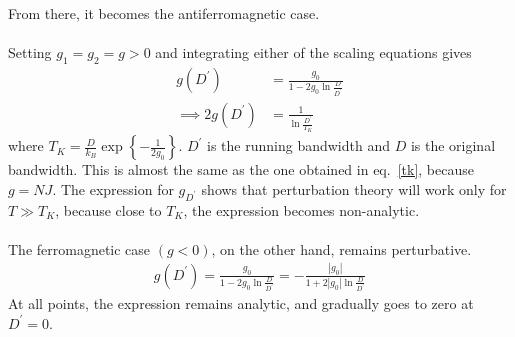 \documentclass[twoside,11pt]{report}
\numberwithin{equation}{section}
\begin{document}
From there, it becomes the antiferromagnetic case.\\\\
Setting \(g_1 = g_2 =g >0\) and integrating either of the scaling equations gives
\begin{equation}\begin{aligned}
	\label{isot}
g(D^\prime) &= \frac{g_0}{1-2g_0\ln\frac{D}{D^\prime}} \\
\implies 2g(D^\prime) &= \frac{1}{\ln \frac{D^\prime}{T_K}}
\end{aligned}\end{equation}
where \(T_K = \frac{D}{k_B} \exp\left\{-\frac{1}{2g_0}\right\}\).
\(D^\prime\) is the running bandwidth and \(D\) is the original bandwidth.
This is almost the same as the one obtained in eq.~\ref{tk}, because \(g = N J\).
The expression for \(g_{D^\prime}\) shows that perturbation theory will work only for \(T \gg T_K\), because close to \(T_K\), the expression becomes non-analytic.\\\\
The ferromagnetic case \((g<0)\), on the other hand, remains perturbative.
\begin{equation}\begin{aligned}
g(D^\prime) = \frac{g_0}{1-2g_0\ln\frac{D}{D^\prime}} = -\frac{|g_0|}{1+2|g_0|\ln\frac{D}{D^\prime}}
\end{aligned}\end{equation}
At all points, the expression remains analytic, and gradually goes to zero at \(D^\prime = 0\).
\end{document}
